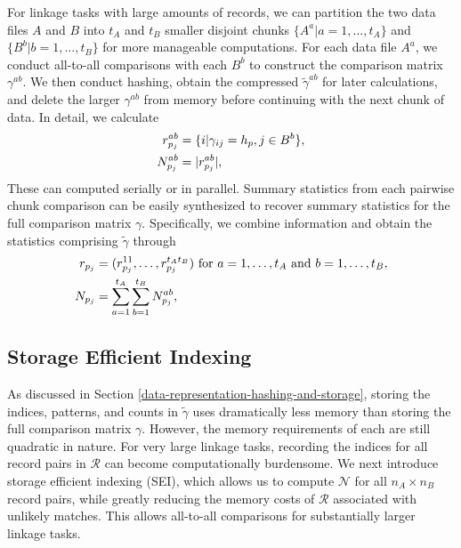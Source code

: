 \documentclass[ba]{imsart}
\begin{document}
		For linkage tasks with large amounts of records, we can partition the two data files $A$ and $B$ into $t_A$ and $t_B$ smaller disjoint chunks $\{A^a | a = 1, \ldots, t_A \}$ and $\{B^b | b = 1, \ldots, t_B\}$ for more manageable computations. {\color{red}{For example, if $n_A = n_B = 50000$ and $t_A = t_B = 100$, each chunk $A^a$ and $B^b$ would contain 500 records.}} For each data file $A^a$, we conduct all-to-all comparisons with each $B^b$ to construct the comparison matrix $\gamma^{ab}$. We then conduct hashing, obtain the compressed $\tilde{\gamma}^{ab}$ for later calculations, and delete the larger $\gamma^{ab}$ from memory before continuing with the next chunk of data. In detail, we calculate
\begin{subequations}
	\begin{align}
		r_{p_j}^{ab} &= \{i | \gamma_{ij} = h_p, j \in B^b\}, \label{r_{p_j}^{ab}} \\
		N_{p_j}^{ab} &= |r_{p_j}^{ab}|, \label{N_{p_j}^{ab}}
	\end{align}
\end{subequations}
These can computed serially or in parallel. Summary statistics from each pairwise chunk comparison can be easily synthesized to recover summary statistics for the full comparison matrix $\gamma$. Specifically, we combine information and obtain the statistics comprising $\tilde{\gamma}$ through
\begin{subequations}
	\begin{align}
		r_{p_j} &= (r_{p_j}^{11}, \ldots, r_{p_j}^{ t_A t_B}) \text{ for } a = 1, \ldots, t_A \text{ and } b = 1, \ldots, t_B, \label{r_{p_j}} \\
		N_{p_j} &= \sum_{a = 1}^{t_A} \sum_{b = 1}^{t_B} N_{p_j}^{ab},\label{N_{p_j}}	\end{align}
\end{subequations} 

\hypertarget{SEI}{%
	\subsection{Storage Efficient Indexing}\label{SEI}}

As discussed in Section \ref{data-representation-hashing-and-storage}, storing the indices, patterns, and counts in $\tilde{\gamma}$ uses dramatically less memory than storing the full comparison matrix $\gamma$. However, the memory requirements of each are still quadratic in nature. For very large linkage tasks, recording the indices for all record pairs in $\mathcal{R}$ can become computationally burdensome. We next introduce storage efficient indexing (SEI), which allows us to compute $\mathcal{N}$ for all $n_A \times n_B$ record pairs, while greatly reducing the memory costs of $\mathcal{R}$ associated with unlikely matches. This allows all-to-all comparisons for substantially larger linkage tasks.
\end{document}
